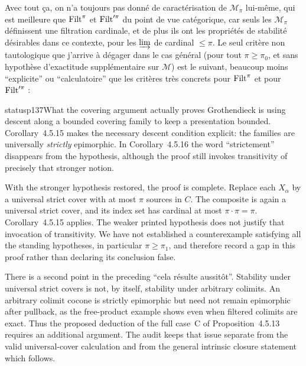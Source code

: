 Avec tout ça, on n'a toujours pas donné de caractérisation de $\mathcal{M}_{\pi}$ lui-même, qui est meilleure que $\mathrm{Filt}^{\pi}$ et $\mathrm{Filt}'^{\pi}$ du point de vue catégorique, car seuls les $\mathcal{M}_{\pi}$ définissent une filtration cardinale, et de plus ils ont les propriétés de stabilité désirables dans ce
contexte, pour les $\varinjlim$ de cardinal $\leqslant \pi$. Le seul critère non tautologique que j'arrive à dégager dans le cas général (pour tout $\pi \geqslant \pi_0$, et sans hypothèse d'exactitude supplémentaire sur $\mathcal{M}$) est le suivant, beaucoup moins ``explicite'' ou ``calculatoire'' que les critères très concrets pour $\mathrm{Filt}^{\pi}$ et pour $\mathrm{Filt}'^{\pi}$ :

\begin{dcomment}{status}{p137}{What the covering argument actually proves}
Grothendieck is using descent along a bounded covering family to keep a presentation bounded. Corollary~4.5.15 makes the necessary descent condition explicit: the families are universally \emph{strictly} epimorphic. In Corollary~4.5.16 the word ``strictement'' disappears from the hypothesis, although the proof still invokes transitivity of precisely that stronger notion.

With the stronger hypothesis restored, the proof is complete. Replace each $X_\alpha$ by a universal strict cover with at most $\pi$ sources in $C$. The composite is again a universal strict cover, and its index set has cardinal at most $\pi\cdot\pi=\pi$. Corollary~4.5.15 applies. The weaker printed hypothesis does not justify that invocation of transitivity. We have not established a counterexample satisfying all the standing hypotheses, in particular $\pi\geq\pi_1$, and therefore record a gap in this proof rather than declaring its conclusion false.

There is a second point in the preceding ``cela r\'esulte aussit\^ot''. Stability under universal strict covers is not, by itself, stability under arbitrary colimits. An arbitrary colimit cocone is strictly epimorphic but need not remain epimorphic after pullback, as the free-product example shows even when filtered colimits are exact. Thus the proposed deduction of the full case~C of Proposition~4.5.13 requires an additional argument. The audit keeps that issue separate from the valid universal-cover calculation and from the general intrinsic closure statement which follows.
\end{dcomment}


